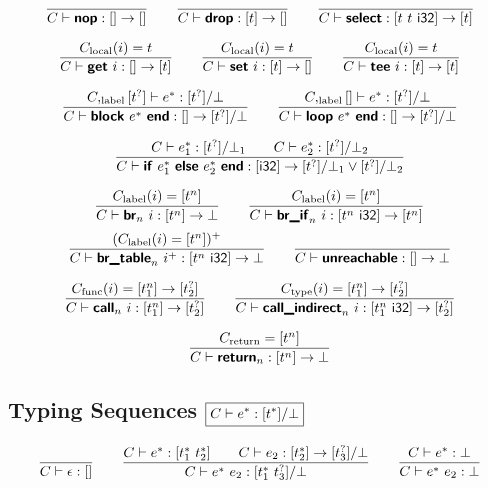 \documentclass[a4paper]{scrartcl}
\newcommand\void[1]{}
\newcommand\f[1]{\ensuremath{\mathop{\mathrm{#1\null}}\nolimits}\xspace}
\newcommand\K[1]{\ensuremath{\textsf{#1}}}
\newcommand\KK[1]{\ensuremath{\K{\textbf{#1}}}}
\begin{document}
$$
\frac{
}{
  C \vdash \KK{nop} : [] \to []
}
\qquad
\frac{
}{
  C \vdash \KK{drop} : [t] \to []
}
\qquad
\frac{
}{
  C \vdash \KK{select} : [t~t~\K{i32}] \to [t]
}
$$

$$
\frac{
  C_{\f{local}}(i) = t
}{
  C \vdash \KK{get}~i : [] \to [t]
}
\qquad
\frac{
  C_{\f{local}}(i) = t
}{
  C \vdash \KK{set}~i : [t] \to []
}
\qquad
\frac{
  C_{\f{local}}(i) = t
}{
  C \vdash \KK{tee}~i : [t] \to [t]
}
$$

$$
\frac{
  C,_{\f{label}}[t^?] \vdash e^\ast : [t^?]\orbot
}{
  C \vdash \KK{block}~e^\ast~\KK{end} : [] \to [t^?]\orbot
}
\qquad
\frac{
  C,_{\f{label}}[] \vdash e^\ast : [t^?]\orbot
}{
  C \vdash \KK{loop}~e^\ast~\KK{end} : [] \to [t^?]\orbot
}
$$

$$
\frac{
  C \vdash e_1^\ast : [t^?]\botrule{\orbot_1}
  \qquad
  C \vdash e_2^\ast : [t^?]\botrule{\orbot_2}
}{
  C \vdash \KK{if}~e_1^\ast~\KK{else}~e_2^\ast~\KK{end} : [\K{i32}] \to [t^?]\botrule{\orbot_1 \vee [t^?]\orbot_2}
}%
\void{\botrule{
~~~~
\begin{array}{rc}
[t^\ast]\vee[t^\ast] = [t^\ast] &
[t^\ast]\vee\bot = [t^\ast] \\
\bot\vee[t^\ast] = [t^\ast] &
\bot\vee\bot = \bot
\end{array}
}}
$$

$$
\frac{
  C_{\f{label}}(i) = [t^n]
}{
  C \vdash \KK{br}_n~i : [t^n] \to \poly{t_0^?}
}
\qquad
\frac{
  C_{\f{label}}(i) = [t^n]
}{
  C \vdash \KK{br\_if}_n~i : [t^n~\K{i32}] \to [t^n]
}
$$
$$
\frac{
  (C_{\f{label}}(i) = [t^n])^+
}{
  C \vdash \KK{br\_table}_n~i^+ : [t^n~\K{i32}] \to \poly{t_0^?}
}
\qquad
\frac{
}{
  C \vdash \KK{unreachable} : [] \to \poly{t^?}
}
$$

$$
\frac{
  C_{\f{func}}(i) = [t_1^n] \to [t_2^?]
}{
  C \vdash \KK{call}_n~i : [t_1^n] \to [t_2^?]
}
\qquad
\frac{
  C_{\f{type}}(i) = [t_1^n] \to [t_2^?]
}{
  C \vdash \KK{call\_indirect}_n~i : [t_1^n~\K{i32}] \to [t_2^?]
}
$$

$$
\frac{
  C_{\f{return}} = [t^n]
}{
  C \vdash \KK{return}_n : [t^n] \to \poly{t_0^?}
}
$$


\subsection*{Typing Sequences \hfill $\boxed{C \vdash e^\ast : [t^\ast]/\bot}$}

$$
\frac{
}{
  C \vdash \epsilon : []
}
\qquad
\frac{
  C \vdash e^\ast : [t_1^\ast~t_2^\ast]
  \qquad
  C \vdash e_2 : [t_2^\ast] \to [t_3^?]\orbot
}{
  C \vdash e^\ast~e_2 : [t_1^\ast~t_3^?]\orbot
}
\botrule{
\qquad
\frac{
  C \vdash e^\ast : \bot
}{
  C \vdash e^\ast~e_2 : \bot
}
}
$$
\end{document}
